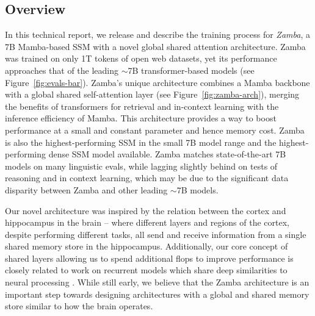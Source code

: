 \subsection{Overview}
\label{sec:overview}
In this technical report, we release and describe the training process for \emph{Zamba}, a 7B Mamba-based SSM with a novel global shared attention architecture. Zamba was trained on only 1T tokens of open web datasets, yet its performance approaches that of the leading $\sim$7B transformer-based models (see Figure~\ref{fig:evals-bar}). Zamba's unique architecture combines a Mamba backbone with a global shared self-attention layer (see Figure~\ref{fig:zamba-arch}), merging the benefits of transformers for retrieval and in-context learning with the inference efficiency of Mamba. This architecture provides a way to boost performance at a small and constant parameter and hence memory cost. Zamba is also the highest-performing SSM in the small 7B model range and the highest-performing dense SSM model available. Zamba matches state-of-the-art 7B models on many linguistic evals, while lagging slightly behind on tests of reasoning and in context learning, which may be due to the significant data disparity between Zamba and other leading $\sim$7B models. 

Our novel architecture was inspired by the relation between the cortex and hippocampus in the brain \citep{whittington_tolman-eichenbaum_2020, whittington_relating_2021} -- where different layers and regions of the cortex, despite performing different tasks, all send and receive information from a single shared memory store in the hippocampus. Additionally, our core concept of shared layers allowing us to spend additional flops to improve performance is closely related to work on recurrent models \citep{dehghani2018universal} which share deep similarities to neural processing \citep{van2020going,tscshantz2023hybrid}. While still early, we believe that the Zamba architecture is an important step towards designing architectures with a global and shared memory store similar to how the brain operates.

